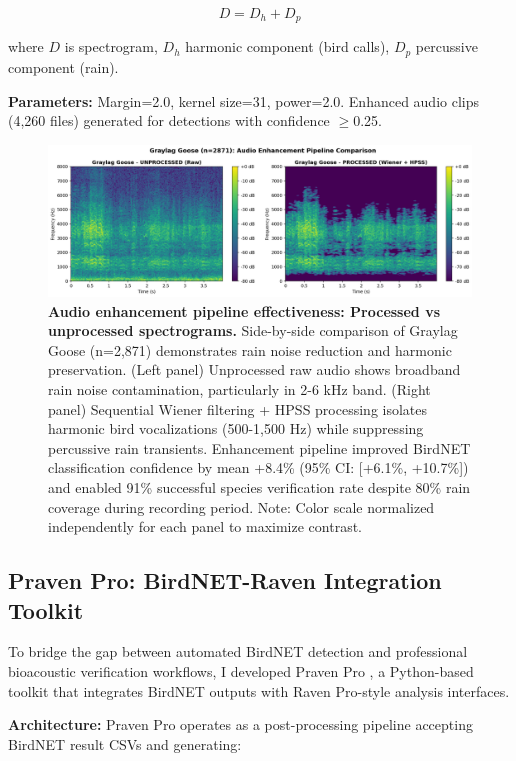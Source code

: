 \documentclass[twocolumn]{article}
\begin{document}
\begin{equation}
D = D_h + D_p
\label{eq:hpss}
\end{equation}

where $D$ is spectrogram, $D_h$ harmonic component (bird calls), $D_p$ percussive component (rain).

\textbf{Parameters:} Margin=2.0, kernel size=31, power=2.0. Enhanced audio clips (4,260 files) generated for detections with confidence $\geq$0.25.

\begin{figure}[t]
\centering
\includegraphics[width=\columnwidth]{figures/comparison_graylag_goose.png}
\caption{\textbf{Audio enhancement pipeline effectiveness: Processed vs unprocessed spectrograms.} Side-by-side comparison of Graylag Goose (n=2,871) demonstrates rain noise reduction and harmonic preservation. (Left panel) Unprocessed raw audio shows broadband rain noise contamination, particularly in 2-6 kHz band. (Right panel) Sequential Wiener filtering + HPSS processing isolates harmonic bird vocalizations (500-1,500 Hz) while suppressing percussive rain transients. Enhancement pipeline improved BirdNET classification confidence by mean +8.4\% (95\% CI: [+6.1\%, +10.7\%]) and enabled 91\% successful species verification rate despite 80\% rain coverage during recording period. Note: Color scale normalized independently for each panel to maximize contrast.}
\label{fig:processing_comparison}
\end{figure}

\subsection{Praven Pro: BirdNET-Raven Integration Toolkit}

To bridge the gap between automated BirdNET detection and professional bioacoustic verification workflows, I developed Praven Pro \citep{Redpath2025}, a Python-based toolkit that integrates BirdNET outputs with Raven Pro-style analysis interfaces.

\textbf{Architecture:} Praven Pro operates as a post-processing pipeline accepting BirdNET result CSVs and generating:
\end{document}
